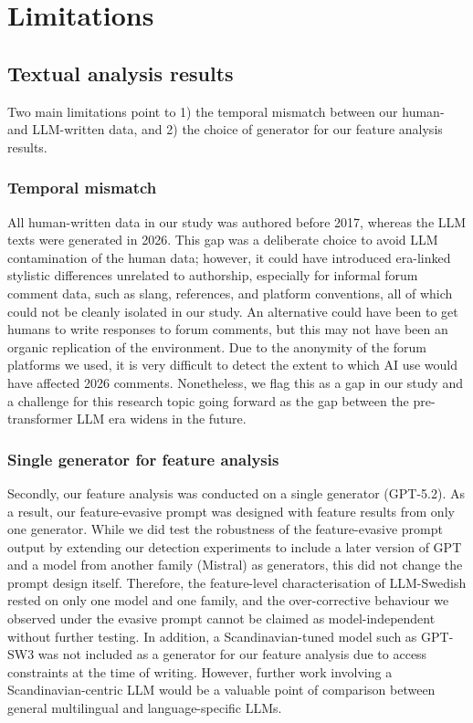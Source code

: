 \documentclass[thesis]{cluu}
\begin{document}
\chapter{Limitations}

\section{Textual analysis results}
Two main limitations point to 1) the temporal mismatch between our human- and LLM-written data, and 2) the choice of generator for our feature analysis results.

\subsection{Temporal mismatch}
All human-written data in our study was authored before 2017, whereas the LLM texts were generated in 2026. This gap was a deliberate choice to avoid LLM contamination of the human data; however, it could have introduced era-linked stylistic differences unrelated to authorship, especially for informal forum comment data, such as slang, references, and platform conventions, all of which could not be cleanly isolated in our study. An alternative could have been to get humans to write responses to forum comments, but this may not have been an organic replication of the environment. Due to the anonymity of the forum platforms we used, it is very difficult to detect the extent to which AI use would have affected 2026 comments. Nonetheless, we flag this as a gap in our study and a challenge for this research topic going forward as the gap between the pre-transformer LLM era widens in the future.

\subsection{Single generator for feature analysis}
Secondly, our feature analysis was conducted on a single generator (GPT-5.2). As a result, our feature-evasive prompt was designed with feature results from only one generator. While we did test the robustness of the feature-evasive prompt output by extending our detection experiments to include a later version of GPT and a model from another family (Mistral) as generators, this did not change the prompt design itself. Therefore, the feature-level characterisation of LLM-Swedish rested on only one model and one family, and the over-corrective behaviour we observed under the evasive prompt cannot be claimed as model-independent without further testing. In addition, a Scandinavian-tuned model such as GPT-SW3 was not included as a generator for our feature analysis due to access constraints at the time of writing. However, further work involving a Scandinavian-centric LLM would be a valuable point of comparison between general multilingual and language-specific LLMs.
\end{document}
